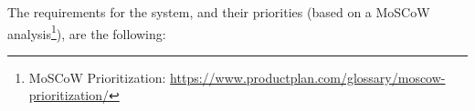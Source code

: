 The requirements for the system, and their priorities (based on a MoSCoW analysis\footnote{MoSCoW Prioritization: \url{https://www.productplan.com/glossary/moscow-prioritization/}}), are the following: 





